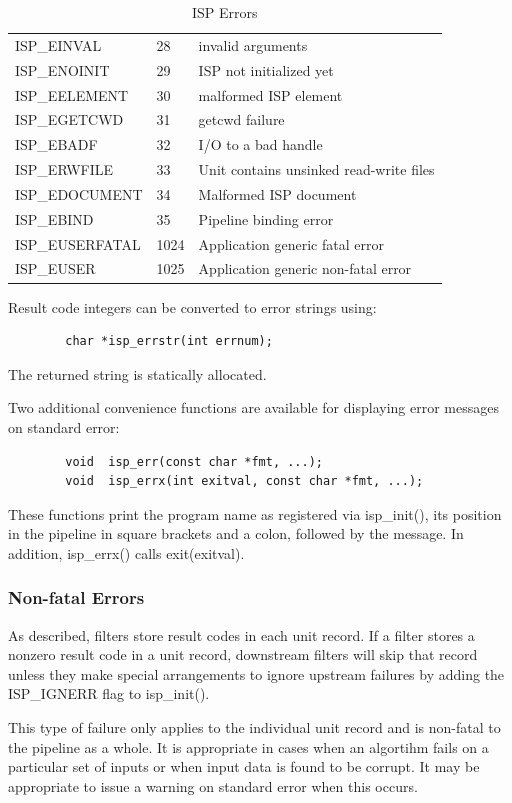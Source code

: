 \documentclass{article}
\begin{document}
\begin{table}
\begin{center}
\begin{tabular}{|l|l|l|}
ISP\_EINVAL   &      28 &invalid arguments\\
ISP\_ENOINIT  &      29 &ISP not initialized yet\\
ISP\_EELEMENT &      30 &malformed ISP element\\
ISP\_EGETCWD  &      31 &getcwd failure\\
ISP\_EBADF    &      32 &I/O to a bad handle\\
ISP\_ERWFILE  &      33 &Unit contains unsinked read-write files\\
ISP\_EDOCUMENT&      34 &Malformed ISP document\\
ISP\_EBIND    &      35 &Pipeline binding error\\
\hline
ISP\_EUSERFATAL&     1024&Application generic fatal error\\
ISP\_EUSER    &      1025&Application generic non-fatal error\\
\hline
\end{tabular}
\end{center}
\caption{ISP Errors}\label{taberrno}
\end{table}

Result code integers can be converted to error strings using:
\begin{verbatim}
        char *isp_errstr(int errnum);
\end{verbatim}
The returned string is statically allocated.

Two additional convenience functions are available for displaying error
messages on standard error:
\begin{verbatim}
        void  isp_err(const char *fmt, ...);
        void  isp_errx(int exitval, const char *fmt, ...);
\end{verbatim}
These functions print the program name as registered via isp\_init(),
its position in the pipeline in square brackets and a colon,
followed by the message.  In addition, isp\_errx() calls exit(exitval).

\subsubsection{Non-fatal Errors}

As described, filters store result codes in each unit record.  
If a filter stores a nonzero result code in a unit record, downstream 
filters will skip that record unless they make special arrangements
to ignore upstream failures by adding the ISP\_IGNERR flag to isp\_init().

This type of failure only applies to the individual unit record and is 
non-fatal to the pipeline as a whole.  It is appropriate in cases when 
an algortihm fails on a particular set of inputs or when input data is 
found to be corrupt.  It may be appropriate to issue a warning on standard
error when this occurs.
\end{document}
